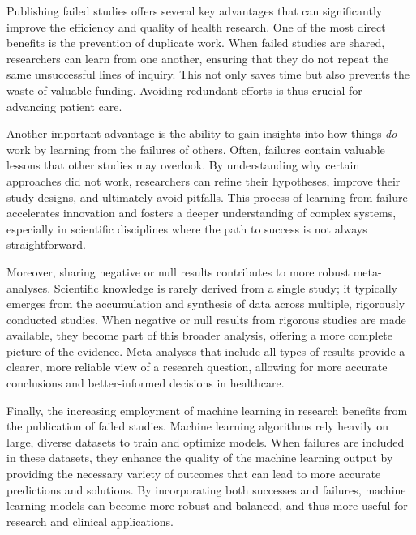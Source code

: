 \documentclass[authordate, empirical, issue]{jote-new-article}
\begin{document}
	Publishing failed studies offers several key advantages that can significantly improve the efficiency and quality of health research. One of the most direct benefits is the prevention of duplicate work. When failed studies are shared, researchers can learn from one another, ensuring that they do not repeat the same unsuccessful lines of inquiry. This not only saves time but also prevents the waste of valuable funding. Avoiding redundant efforts is thus crucial for advancing patient care.



	Another important advantage is the ability to gain insights into how things \emph{do} work by learning from the failures of others. Often, failures contain valuable lessons that other studies may overlook. By understanding why certain approaches did not work, researchers can refine their hypotheses, improve their study designs, and ultimately avoid pitfalls. This process of learning from failure accelerates innovation and fosters a deeper understanding of complex systems, especially in scientific disciplines where the path to success is not always straightforward.



	Moreover, sharing negative or null results contributes to more robust meta-analyses. Scientific knowledge is rarely derived from a single study; it typically emerges from the accumulation and synthesis of data across multiple, rigorously conducted studies. When negative or null results from rigorous studies are made available, they become part of this broader analysis, offering a more complete picture of the evidence. Meta-analyses that include all types of results provide a clearer, more reliable view of a research question, allowing for more accurate conclusions and better-informed decisions in healthcare.



	Finally, the increasing employment of machine learning in research benefits from the publication of failed studies. Machine learning algorithms rely heavily on large, diverse datasets to train and optimize models. When failures are included in these datasets, they enhance the quality of the machine learning output by providing the necessary variety of outcomes that can lead to more accurate predictions and solutions. By incorporating both successes and failures, machine learning models can become more robust and balanced, and thus more useful for research and clinical applications.
\end{document}
